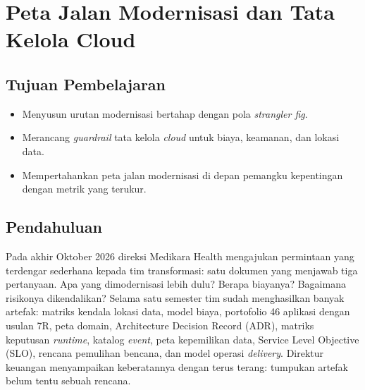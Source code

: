 \chapter{Peta Jalan Modernisasi dan Tata Kelola Cloud}
\label{ch:ch14}



\section*{Tujuan Pembelajaran}
\begin{itemize}
  \item Menyusun urutan modernisasi bertahap dengan pola \textit{strangler fig}.
  \item Merancang \textit{guardrail} tata kelola \textit{cloud} untuk biaya, keamanan, dan lokasi data.
  \item Mempertahankan peta jalan modernisasi di depan pemangku kepentingan dengan metrik yang terukur.
\end{itemize}

\section{Pendahuluan}

Pada akhir Oktober 2026 direksi Medikara Health mengajukan permintaan yang terdengar sederhana kepada
tim transformasi: satu dokumen yang menjawab tiga pertanyaan. Apa yang dimodernisasi lebih dulu?
Berapa biayanya? Bagaimana risikonya dikendalikan? Selama satu semester tim sudah menghasilkan banyak
artefak: matriks kendala lokasi data, model biaya, portofolio 46 aplikasi dengan usulan 7R, peta
domain, Architecture Decision Record (ADR), matriks keputusan \textit{runtime}, katalog
\textit{event}, peta kepemilikan data, Service Level Objective (SLO), rencana pemulihan bencana, dan
model operasi \textit{delivery}. Direktur keuangan menyampaikan keberatannya dengan terus terang:
tumpukan artefak belum tentu sebuah rencana.

